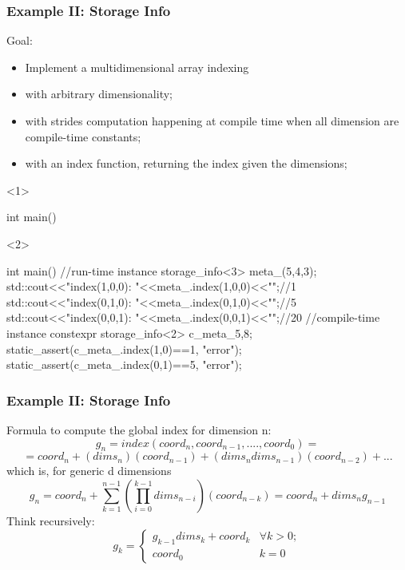 \documentclass[aspectratio=43]{beamer}
\begin{document}
\begin{frame}[fragile]\frametitle{Example II: Storage Info}
  Goal:
  \begin{itemize}
  \item Implement a multidimensional array indexing
  \item with arbitrary dimensionality;
  \item with strides computation happening at compile time when all dimension are compile-time constants;
  \item with an index function, returning the index given the dimensions;
  \end{itemize}

  \begin{onlyenv}<1>
    \begin{Cpplisting}{}
int main(){









}
    \end{Cpplisting}
  \end{onlyenv}
  \begin{onlyenv}<2>
  \begin{Cpplisting}{}
int main(){
  //run-time instance
  storage_info<3> meta_(5,4,3);
  std::cout<<"index(1,0,0): "<<meta_.index(1,0,0)<<"\n";//1
  std::cout<<"index(0,1,0): "<<meta_.index(0,1,0)<<"\n";//5
  std::cout<<"index(0,0,1): "<<meta_.index(0,0,1)<<"\n";//20
  //compile-time instance
  constexpr storage_info<2> c_meta_{5,8};
  static_assert(c_meta_.index(1,0)==1, "error");
  static_assert(c_meta_.index(0,1)==5, "error");
}
    \end{Cpplisting}
  \end{onlyenv}
\end{frame}


\begin{frame}[fragile]\frametitle{Example II: Storage Info}
  Formula to compute the global index for dimension n:
  $$
  g_n = index(coord_n, coord_{n-1}, ...., coord_0) =
  $$
  $$
  = coord_n + (dims_{n})(coord_{n-1}) + (dims_{n}dims_{n-1})(coord_{n-2}) + ...
  $$
  which is, for generic d dimensions
  $$
  g_n = coord_n + \sum_{k=1}^{n-1}\left(\prod_{i=0}^{k-1}dims_{n-i}\right)(coord_{n-k}) = coord_n + dims_ng_{n-1}
  $$
  Think recursively:
  $$
  g_k =
  \left\{
  \begin{array}{ll}
      g_{k-1} dims_{k} + coord_{k} & \forall k>0;\\
      coord_0 & k=0
  \end{array}
  \right.
  $$


\end{frame}
\end{document}
